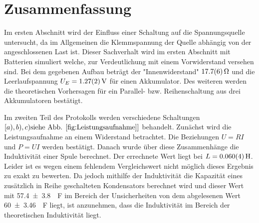 
\section{Zusammenfassung}
Im ersten Abschnitt wird der Einfluss einer Schaltung auf die Spannungsquelle untersucht, da im Allgemeinen die Klemmspannung der Quelle abhängig von der angeschlossenen Last ist. Dieser Sachverhalt wird im ersten Abschnitt mit Batterien simuliert welche, zur Verdeutlichung mit einem Vorwiderstand versehen sind. Bei dem gegebenen Aufbau beträgt der "Innenwiderstand" $\SI{17.7+-0.6}{\ohm}$ und die Leerlaufspannung $U_E=\SI{1.27+-0.02}{V}$ für einen Akkumulator. Des weiteren werden die theoretischen Vorhersagen für ein Parallel- bzw. Reihenschaltung aus drei Akkumulatoren bestätigt.

Im zweiten Teil des Protokolls werden verschiedene Schaltungen  $\left[ a),b),c) \text{siehe Abb. \ref{fig:Leistungsaufnahme}} \right]$ behandelt.
Zunächst wird die Leistungsaufnahme an einem Widerstand betrachtet. Die Beziehungen $U=RI$ und $P=UI$ werden bestätigt.
Danach wurde über diese Zusammenhänge die Induktivität einer Spule berechnet.
Der errechnete Wert liegt bei $L= \SI{0,060+-0,004}{H}$. Leider ist es wegen einem fehlendem Vergleichswert nicht möglich dieses Ergebnis zu exakt zu bewerten. 
Da jedoch  mithilfe der Induktivität die Kapazität eines zusätzlich in Reihe geschalteten Kondensators berechnet wird und dieser Wert mit \SI{57.4+-3.8}{\mu F} im Bereich der Unsicherheiten von dem abgelesenen Wert \SI{60+-3.46}{\mu F} liegt, ist anzunehmen, dass die Induktivität im Bereich der theoretischen Induktivität liegt.







